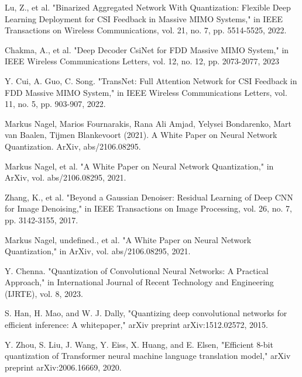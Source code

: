 \documentclass[lettersize,journal]{IEEEtran}
\begin{document}
\begin{thebibliography}{00}
	Lu, Z., et al. "Binarized Aggregated Network With Quantization: Flexible Deep Learning Deployment for CSI Feedback in Massive MIMO Systems," in IEEE Transactions on Wireless Communications, vol. 21, no. 7, pp. 5514-5525, 2022.
	
	Chakma, A., et al. "Deep Decoder CsiNet for FDD Massive MIMO System," in IEEE Wireless Communications Letters, vol. 12, no. 12, pp. 2073-2077, 2023
	
	Y. Cui, A. Guo, C. Song. "TransNet: Full Attention Network for CSI Feedback in FDD Massive MIMO System," in IEEE Wireless Communications Letters, vol. 11, no. 5, pp. 903-907, 2022.
	
	Markus Nagel, Marios Fournarakis, Rana Ali Amjad, Yelysei Bondarenko, Mart van Baalen, Tĳmen Blankevoort (2021). A White Paper on Neural Network Quantization. ArXiv, abs/2106.08295.
	
	Markus Nagel, et al. "A White Paper on Neural Network Quantization," in ArXiv, vol. abs/2106.08295, 2021.
	
	Zhang, K., et al. "Beyond a Gaussian Denoiser: Residual Learning of Deep CNN for Image Denoising," in IEEE Transactions on Image Processing, vol. 26, no. 7, pp. 3142-3155, 2017.
	
	Markus Nagel, undefined., et al. "A White Paper on Neural Network Quantization," in ArXiv, vol. abs/2106.08295, 2021.
	
	Y. Chenna. "Quantization of Convolutional Neural Networks: A Practical Approach," in International Journal of Recent Technology and Engineering (ĲRTE), vol. 8, 2023.
	
	S. Han, H. Mao, and W. J. Dally, "Quantizing deep convolutional networks for efficient inference: A whitepaper," arXiv preprint arXiv:1512.02572, 2015.
	
	Y. Zhou, S. Liu, J. Wang, Y. Eiss, X. Huang, and E. Elsen, "Efficient 8-bit quantization of Transformer neural machine language translation model," arXiv preprint arXiv:2006.16669, 2020.
	
\end{thebibliography}
\end{document}
